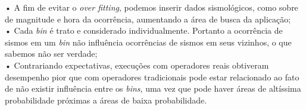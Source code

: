 • A fim de evitar o {\it over fitting}, podemos inserir dados sismológicos, como sobre de magnitude e hora da ocorrência, aumentando a área de busca da aplicação;\\

• Cada {\it bin} é trato e considerado individualmente. Portanto a ocorrência de sismos em um {\it bin} não influência ocorrências de sismos em seus vizinhos, o que sabemos não ser verdade;\\

• Contrariando expectativas, execuções com operadores reais obtiveram desempenho pior que com operadores tradicionais pode estar relacionado ao fato de não existir influência entre os {\it bins}, uma vez que pode haver áreas de altíssima probabilidade próximas a áreas de baixa probabilidade.\\
